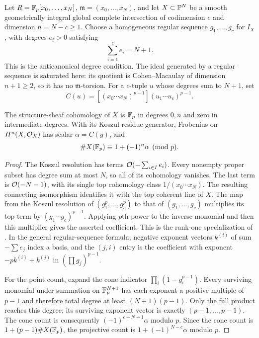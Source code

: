 Let $R=\mathbb F_p[x_0,\ldots,x_N]$, $\mathfrak m=(x_0,\ldots,x_N)$, and let
$X\subset\mathbb P^N$ be a smooth geometrically integral global complete
intersection of codimension $c$ and dimension $n=N-c\geq1$.
Choose a homogeneous regular sequence $g_1,\ldots,g_c$ for $I_X$,
with degrees $e_i>0$ satisfying
\[
 \sum_{i=1}^c e_i=N+1.
\]
This is the anticanonical degree condition. The ideal generated by a
regular sequence is saturated here: its quotient is Cohen--Macaulay
of dimension $n+1\geq2$, so it has no $\mathfrak m$-torsion.
For a $c$-tuple $u$ whose degrees sum to $N+1$, set
\[
 C(u)=[(x_0\cdots x_N)^{p-1}](u_1\cdots u_c)^{p-1}.
\]

\begin{proposition}
\label{sp:prop:ci-coefficient}
The structure-sheaf cohomology of $X$ is $\mathbb F_p$ in degrees $0,n$ and
zero in intermediate degrees. With its Koszul residue generator,
Frobenius on $H^n(X,\mathcal O_X)$ has scalar $\alpha=C(g)$, and
\[
 \#X(\mathbb F_p)\equiv1+(-1)^n\alpha\pmod p.
\]
\end{proposition}
\begin{proof}
The Koszul resolution has terms $\mathcal O(-\sum_{i\in I}e_i)$.
Every nonempty proper subset has degree sum at most $N$, so all of
its cohomology vanishes. The last term is $\mathcal O(-N-1)$, with its single
top cohomology class $1/(x_0\cdots x_N)$. The resulting connecting
isomorphism identifies it with the top coherent line of $X$.
The map from the Koszul resolution of $(g_1^p,\ldots,g_c^p)$ to that
of $(g_1,\ldots,g_c)$ multiplies its top term by
$(g_1\cdots g_c)^{p-1}$. Applying $p$th power to the inverse monomial
and then this multiplier gives the asserted coefficient.
This is the rank-one specialization of
\citet[Proposition~4.2.1, pp.~18--19, and Algorithm~II, \S4.3]{sp-kudo}.
In the general regular-sequence formula, negative exponent vectors
$k^{(i)}$ of sum $-\sum e_j$ index a basis, and the $(j,i)$ entry is
the coefficient with exponent $-p k^{(i)}+k^{(j)}$ in
$(\prod g_j)^{p-1}$.

For the point count, expand the cone indicator
$\prod_i(1-g_i^{p-1})$. Every surviving monomial under summation on
$\mathbb F_p^{N+1}$ has each exponent a positive multiple of $p-1$ and therefore
total degree at least $(N+1)(p-1)$. Only the full product reaches this
degree; its surviving exponent vector is exactly $(p-1,\ldots,p-1)$.
The cone count is consequently $(-1)^{c+N+1}\alpha$ modulo $p$.
Since the cone count is $1+(p-1)\#X(\mathbb F_p)$, the projective count is
$1+(-1)^{N-c}\alpha$ modulo $p$.
\end{proof}

